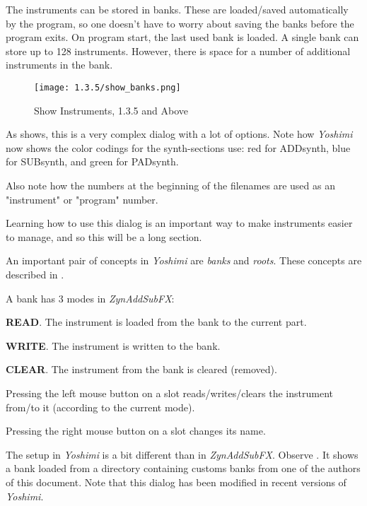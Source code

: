    The instruments can be stored in banks. These are loaded/saved
   automatically by the program, so one doesn't have to worry about saving the
   banks before the program exits. On program start, the last used bank is
   loaded. A single bank can store up to 128 instruments. 
   However, there is space for a number of additional
   instruments in the bank.


\begin{figure}[H]
   \centering 
   \texttt{[image: 1.3.5/show\_banks.png]}
   \caption[Show Instruments]{Show Instruments, 1.3.5 and Above}
   \label{fig:show_instruments}
\end{figure}

   As 
   shows, this is a very complex dialog with a lot of options.
   Note how \textsl{Yoshimi} now shows the color codings for the
   synth-sections use:  red for ADDsynth, blue for SUBsynth, and
   green for PADsynth.

   Also note how the numbers at the beginning of the filenames are used as
   an "instrument" or "program" number.

   Learning how to use this dialog is an important way to make
   instruments easier to manage, and so this will be a long section.

   An important pair of concepts in \textsl{Yoshimi} are
   \textsl{banks} and \textsl{roots}.  These concepts are described in
   .

   A bank has 3 modes in \textsl{ZynAddSubFX}: 

   \begin{enumber}
      \item \textbf{READ}.
         The instrument is loaded from the bank to the current part.
      \item \textbf{WRITE}.
         The instrument is written to the bank.
      \item \textbf{CLEAR}.
         The instrument from the bank is cleared (removed).
   \end{enumber}

   Pressing the left mouse button on a slot reads/writes/clears the
   instrument from/to it (according to the current mode).
   
   Pressing the right mouse button on a slot changes its name.

   The setup in \textsl{Yoshimi} is a bit different than in
   \textsl{ZynAddSubFX}.
   Observe .
   It shows a bank loaded from a directory containing customs
   banks from one of the authors of this document.
   Note that this dialog has been modified in recent versions of
   \textsl{Yoshimi}.

